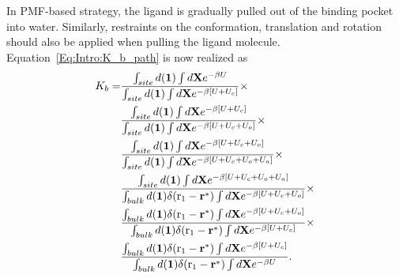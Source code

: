 In PMF-based strategy, the ligand is gradually pulled out of the binding pocket into water. Similarly, restraints on the conformation, translation and rotation should also be applied when pulling the ligand molecule. Equation~\ref{Eq:Intro:K_b_path} is now realized as
\begin{align}
K_b=&\frac{\int_{site}d(\mathbf{1})\int d\mathbf{X}e^{-\beta U}}{\int_{site}d(\mathbf{1})\int d\mathbf{X}e^{-\beta [U+U_c]}}\times\notag\\
    &\frac{\int_{site}d(\mathbf{1})\int d\mathbf{X}e^{-\beta [U+U_c]}}{\int_{site}d(\mathbf{1})\int d\mathbf{X}e^{-\beta [U+U_c+U_o]}}\times\notag\\
    &\frac{\int_{site}d(\mathbf{1})\int d\mathbf{X}e^{-\beta [U+U_c+U_o]}}{\int_{site}d(\mathbf{1})\int d\mathbf{X}e^{-\beta [U+U_c+U_o+U_a]}}\times\notag\\
    &\frac{\int_{site}d(\mathbf{1})\int d\mathbf{X}e^{-\beta [U+U_c+U_o+U_a]}}{\int_{bulk}d(\mathbf{1})\delta(\mathrm{r}_1-\mathbf{r}^*)\int d\mathbf{X}e^{-\beta [U+U_c+U_o]}}\times\notag\\
    &\frac{\int_{bulk}d(\mathbf{1})\delta(\mathrm{r}_1-\mathbf{r}^*)\int d\mathbf{X}e^{-\beta [U+U_c+U_o]}}{\int_{bulk}d(\mathbf{1})\delta(\mathrm{r}_1-\mathbf{r}^*)\int d\mathbf{X}e^{-\beta [U+U_c]}}\times\notag\\
    &\frac{\int_{bulk}d(\mathbf{1})\delta(\mathrm{r}_1-\mathbf{r}^*)\int d\mathbf{X}e^{-\beta [U+U_c]}}{\int_{bulk}d(\mathbf{1})\delta(\mathrm{r}_1-\mathbf{r}^*)\int d\mathbf{X}e^{-\beta U}}.
\end{align}